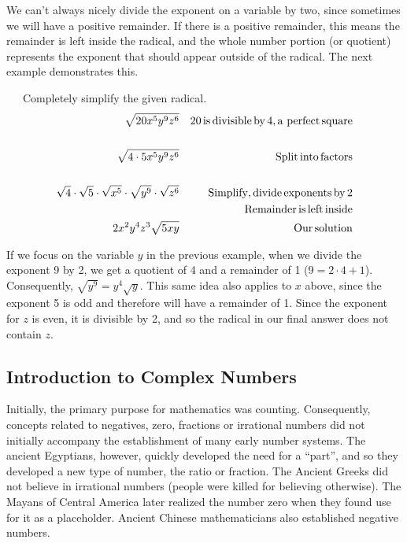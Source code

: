 We can't always nicely divide the exponent on a variable by two, since sometimes we
will have a positive remainder. If there is a positive remainder, this means the remainder is left
inside the radical, and the whole number portion (or quotient) represents the exponent that should appear outside of the
radical. The next example demonstrates this.

\begin{example}~~~Completely simplify the given radical.
  \begin{eqnarray*}
    \sqrt{20 x^5 y^9 z^6} &  & 20 \operatorname{is} \operatorname{divisible} \operatorname{by} 4, \operatorname{a~perfect} \operatorname{square}\\
    & & \\
		\sqrt{4 \cdot 5 x^5 y^9 z^6} &  & \operatorname{Split} \operatorname{into}
    \operatorname{factors}\\
    & & \\
		\sqrt{4} \cdot \sqrt{5} \cdot \sqrt{x^5} \cdot \sqrt{y^9} \cdot \sqrt{z^6}
    &  & \operatorname{Simplify}, \operatorname{divide} \operatorname{exponents} \operatorname{by} 2\\
    & & ~~~\operatorname{Remainder} \operatorname{is} \operatorname{left} \operatorname{inside}\\
    2 x^2 y^4 z^3 \sqrt{5 x y} &  & \operatorname{Our} \operatorname{solution}
  \end{eqnarray*}
\end{example}

If we focus on the variable $y$ in the previous example, when we divide the exponent 9 by 2, we get a quotient of 4 and a remainder of 1 ($9=2\cdot 4+1$).  Consequently, $\sqrt{y^9}=y^4\sqrt{y}$. This same idea also applies to $x$ above, since the exponent 5 is odd and therefore will have a remainder of 1.  Since the exponent for $z$ is even, it is divisible by 2, and so the radical in our final answer does not contain $z$.
\newpage

\subsection{Introduction to Complex Numbers}\pp

{}\pp

{} Initially, the primary
purpose for mathematics was counting. Consequently, concepts related to negatives, zero,
fractions or irrational numbers did not initially accompany the establishment of many early number systems.  The ancient Egyptians, however, quickly developed the need for a ``part'', and so they developed a new type of number,
the ratio or fraction. The Ancient Greeks did not believe in irrational
numbers (people were killed for believing otherwise). The Mayans of Central
America later realized the number zero when they found use for it as a
placeholder. Ancient Chinese mathematicians also established negative numbers.\pp

